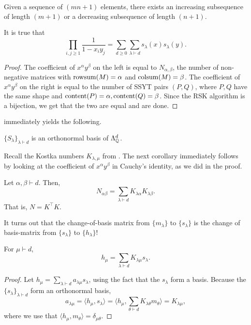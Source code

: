 	\begin{fcor}
		Given a sequence of $(mn+1)$ elements, there exists an increasing subsequence of length $(m+1)$ or a decreasing subsequence of length $(n+1)$.
	\end{fcor}

	\begin{fcor}
		It is true that
		\[ \prod_{i,j \ge 1} \frac{1}{1-x_iy_j} = \sum_{d \ge 0} \sum_{\lambda \vdash d} s_\lambda(x) s_\lambda(y). \]
	\end{fcor}

	\begin{proof}
		The coefficient of $x^\alpha y^\beta$ on the left is equal to $N_{\alpha,\beta}$, the number of non-negative matrices with $\operatorname{rowsum}(M) = \alpha$ and $\operatorname{colsum}(M) = \beta$.  The coefficient of $x^\alpha y^\beta$ on the right is equal to the number of SSYT pairs $(P,Q)$, where $P,Q$ have the same shape and $\operatorname{content}(P) = \alpha, \operatorname{content}(Q) = \beta$. Since the RSK algorithm is a bijection, we get that the two are equal and are done.
	\end{proof}

	 immediately yields the following.

	\begin{fcor}
		$\{S_\lambda\}_{\lambda \vdash d}$ is an orthonormal basis of $\Lambda^d_{\mathbb{Q}}$.
	\end{fcor}

	Recall the Kostka numbers $K_{\lambda,\mu}$ from . The next corollary immediately follows by looking at the coefficient of $x^\alpha y^\beta$ in Cauchy's identity, as we did in the proof.

	\begin{fcor}
		Let $\alpha,\beta \vdash d$. Then,
		\[ N_{\alpha\beta} = \sum_{\lambda \vdash d} K_{\lambda\alpha} K_{\lambda \beta}. \]
		That is, $N = K^\top K$.
	\end{fcor}

	It turns out that the change-of-basis matrix from $\{m_\lambda\}$ to $\{s_\lambda\}$ is the change of basis-matrix from $\{s_\lambda\}$ to $\{h_\lambda\}$!

	\begin{fcor}
		For $\mu \vdash d$,
		\[ h_\mu = \sum_{\lambda \vdash d} K_{\lambda\mu} s_\lambda. \]
	\end{fcor}
	\begin{proof}
		Let $h_\mu = \sum_{\lambda \vdash d} a_{\lambda\mu} s_\lambda$, using the fact that the $s_\lambda$ form a basis. Because the $\{s_\lambda\}_{\lambda \vdash d}$ form an orthonormal basis,
		\[ a_{\lambda\mu} = \langle h_\mu , s_\lambda \rangle = \langle  h_\mu , \sum_{\theta \vdash d} K_{\lambda\theta} m_\theta \rangle = K_{\lambda\mu}, \]
		where we use that $\langle h_\mu,m_\theta\rangle = \delta_{\mu\theta}$.
	\end{proof}

